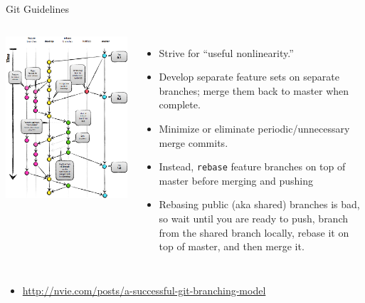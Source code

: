 \documentclass[mathserif]{beamer}
\begin{document}
\begin{frame}[fragile]{Git Guidelines}
  \begin{columns}
    \includegraphics[width=\textwidth]{git_branching}
    \begin{itemize}\itemsep=.05\textheight
    \item Strive for ``useful nonlinearity.''
    \item Develop separate feature sets on separate branches; merge them back to master when complete.
    \item Minimize or eliminate periodic/unnecessary merge commits.
    \item Instead, \texttt{rebase} feature branches on top of master before merging and pushing
    \item Rebasing public (aka shared) branches is bad\texttrademark, so wait until you are ready to push,
      branch from the shared branch locally, rebase it on top of master, and then merge it.
    \end{itemize}
  \end{columns}
    \small
    \begin{itemize}
    \item \url{http://nvie.com/posts/a-successful-git-branching-model}
    \end{itemize}
\end{frame}
\end{document}
